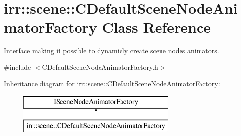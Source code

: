 \hypertarget{classirr_1_1scene_1_1_c_default_scene_node_animator_factory}{\section{irr\-:\-:scene\-:\-:C\-Default\-Scene\-Node\-Animator\-Factory Class Reference}
\label{classirr_1_1scene_1_1_c_default_scene_node_animator_factory}
}


Interface making it possible to dynamicly create scene nodes animators.  




{\ttfamily \#include $<$C\-Default\-Scene\-Node\-Animator\-Factory.\-h$>$}

Inheritance diagram for irr\-:\-:scene\-:\-:C\-Default\-Scene\-Node\-Animator\-Factory\-:\begin{figure}[H]
\begin{center}
\leavevmode
\includegraphics[height=2.000000cm]{classirr_1_1scene_1_1_c_default_scene_node_animator_factory}
\end{center}
\end{figure}
